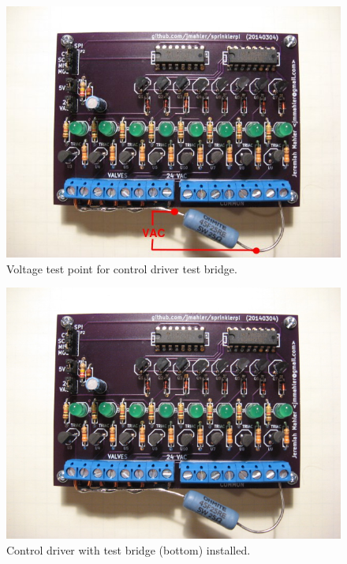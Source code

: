 \documentclass{article}
\begin{document}
\begin{figure}[htbp!]
\begin{center}
\includegraphics[scale=0.6]{img/control_driver_tb_03.jpg}
\end{center}
\caption{Voltage test point for control driver test bridge.}\label{fig:cdbtest}
\end{figure}

\begin{figure}[htbp!]
\begin{center}
\includegraphics[scale=0.6]{img/control_driver_tb_02.jpg}
\end{center}
\caption{Control driver with test bridge (bottom) installed.}
\label{fig:cdbridge}
\end{figure}
\end{document}
